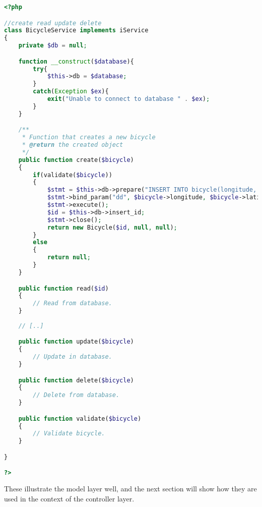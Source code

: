 \begin{lstlisting}[language=php, label=lst:bicycleService]
<?php

//create read update delete
class BicycleService implements iService
{
    private $db = null;

    function __construct($database){
        try{
            $this->db = $database;
        }
        catch(Exception $ex){
            exit("Unable to connect to database " . $ex);
        }
    }

    /**
     * Function that creates a new bicycle
     * @return the created object
     */
    public function create($bicycle)
    {
        if(validate($bicycle))
        {
            $stmt = $this->db->prepare("INSERT INTO bicycle(longitude, latitude) VALUES (?,?)");
            $stmt->bind_param("dd", $bicycle->longitude, $bicycle->latitude);
            $stmt->execute();
            $id = $this->db->insert_id;
            $stmt->close();
            return new Bicycle($id, null, null);
        }
        else
        {
            return null;
        }
    }

    public function read($id)
    {
        // Read from database.
    }
    
    // [..]

    public function update($bicycle)
    {
        // Update in database.
    }

    public function delete($bicycle)
    {
        // Delete from database.
    }

    public function validate($bicycle)
    {
        // Validate bicycle.
    }

}

?>
\end{lstlisting}

These illustrate the model layer well, and the next section will show how they are used in the context of the controller layer.